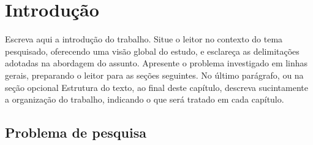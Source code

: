\documentclass[tcc,capa]{texifsap}
\begin{document}
\tableofcontents



\chapter{Introdução}


Escreva aqui a introdução do trabalho. Situe o leitor no contexto do
tema pesquisado, oferecendo uma visão global do estudo, e esclareça as
delimitações adotadas na abordagem do assunto. Apresente o problema
investigado em linhas gerais, preparando o leitor para as seções
seguintes. No último parágrafo, ou na seção opcional Estrutura do
texto, ao final deste capítulo, descreva sucintamente a organização
do trabalho, indicando o que será tratado em cada capítulo.

\section{Problema de pesquisa}
\end{document}
